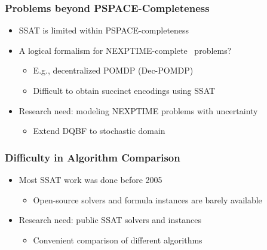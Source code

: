 \begin{frame}
      \frametitle{Problems beyond PSPACE-Completeness}
      \begin{itemize}
            \item SSAT is limited within PSPACE-completeness
                  \pause
            \item A logical formalism for NEXPTIME-complete~\cite{Peterson1979} problems?
                  \pause
                  \begin{itemize}
                        \item E.g., decentralized POMDP (Dec-POMDP)~\cite{Bernstein2002}
                              \pause
                        \item Difficult to obtain succinct encodings using SSAT
                              \pause
                  \end{itemize}
            \item \alert{Research need: modeling NEXPTIME problems with uncertainty}
                  \pause
                  \begin{itemize}
                        \item Extend DQBF to stochastic domain
                  \end{itemize}
      \end{itemize}
\end{frame}

\begin{frame}
      \frametitle{Difficulty in Algorithm Comparison}
      \begin{itemize}
            \item Most SSAT work was done before 2005~\cite{Majercik1998,Majercik2003,Majercik2004,Majercik2005}
                  \pause
                  \begin{itemize}
                        \item Open-source solvers and formula instances are barely available
                              \pause
                  \end{itemize}
            \item \alert{Research need: public SSAT solvers and instances}
                  \pause
                  \begin{itemize}
                        \item Convenient comparison of different algorithms
                  \end{itemize}
      \end{itemize}
\end{frame}